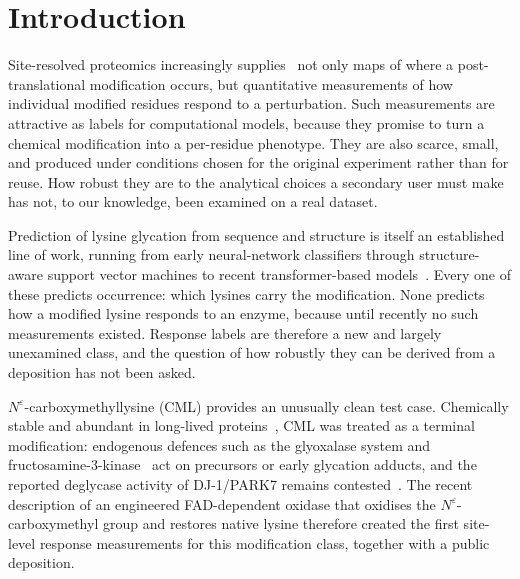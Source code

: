 \documentclass[journal=jprobs,manuscript=article,layout=traditional]{achemso}
\begin{document}
\section{Introduction}

Site-resolved proteomics increasingly supplies~\cite{disanzo2021a} not only maps of where a post-translational modification occurs, but quantitative measurements of how individual modified residues respond to a perturbation. Such measurements are attractive as labels for computational models, because they promise to turn a chemical modification into a per-residue phenotype. They are also scarce, small, and produced under conditions chosen for the original experiment rather than for reuse. How robust they are to the analytical choices a secondary user must make has not, to our knowledge, been examined on a real dataset.

Prediction of lysine glycation from sequence and structure is itself an established line of work, running from early neural-network classifiers through structure-aware support vector machines to recent transformer-based models~\cite{johansen2006,reddy2018,yu2019,liu2022,jia2024}. Every one of these predicts occurrence: which lysines carry the modification. None predicts how a modified lysine responds to an enzyme, because until recently no such measurements existed. Response labels are therefore a new and largely unexamined class, and the question of how robustly they can be derived from a deposition has not been asked.

$N^{\varepsilon}$-carboxymethyllysine (CML) provides an unusually clean test case. Chemically stable and abundant in long-lived proteins~\cite{chaudhuri2018}, CML was treated as a terminal modification: endogenous defences such as the glyoxalase system and fructosamine-3-kinase~\cite{schalkwijk2020} act on precursors or early glycation adducts, and the reported deglycase activity of DJ-1/PARK7 remains contested~\cite{richarme2015}. The recent description of an engineered FAD-dependent oxidase that oxidises the $N^{\varepsilon}$-carboxymethyl group and restores native lysine therefore created the first site-level response measurements for this modification class, together with a public deposition.
\end{document}
